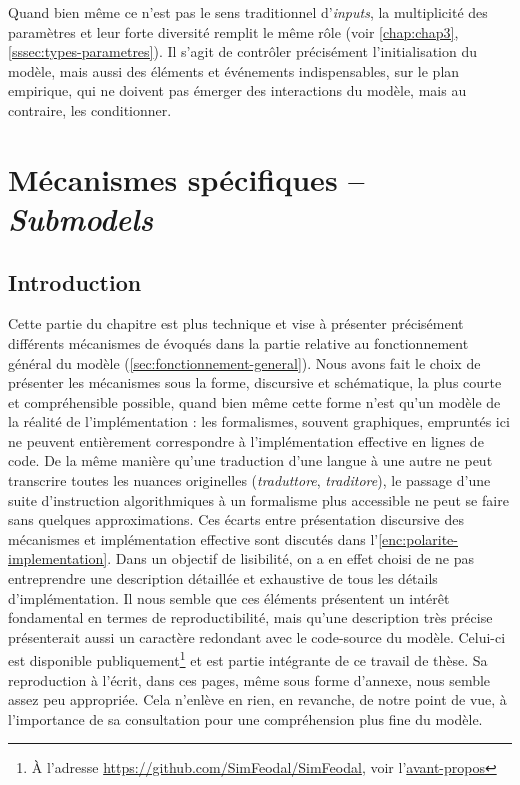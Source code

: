 Quand bien même ce n'est pas le sens traditionnel d'\textit{inputs}, la multiplicité des paramètres et leur forte diversité remplit le même rôle (voir \cref{chap:chap3}, \cref{sssec:types-parametres}).
Il s'agit de contrôler précisément l'initialisation du modèle, mais aussi des éléments et événements indispensables, sur le plan empirique, qui ne doivent pas émerger des interactions du modèle, mais au contraire, les conditionner.


\let\orisectionmark\sectionmark
\renewcommand\sectionmark[1]{}%
\section[Mécanismes spécifiques -- \textit{Submodels}]{Mécanismes spécifiques -- \large{\textit{Submodels}} \label{sec:meca-specifiques}}
\orisectionmark{Mécanismes spécifiques}
\let\sectionmark\orisectionmark



\subsection{Introduction}

Cette partie du chapitre est plus technique et vise à présenter précisément différents mécanismes de \simfeodal{} évoqués dans la partie relative au fonctionnement général du modèle (\cref{sec:fonctionnement-general}).
Nous avons fait le choix de présenter les mécanismes sous la forme, discursive et schématique, la plus courte et compréhensible possible, quand bien même cette forme n'est qu'un \og modèle\fg{} de la réalité de l'implémentation : les formalismes, souvent graphiques, empruntés ici ne peuvent entièrement correspondre à l'implémentation effective en lignes de code.
De la même manière qu'une traduction d'une langue à une autre ne peut transcrire toutes les nuances originelles (\textit{traduttore}, \textit{traditore}), le passage d'une suite d'instruction algorithmiques à un formalisme plus accessible ne peut se faire sans quelques approximations.
Ces écarts entre présentation discursive des mécanismes et implémentation effective sont discutés dans l'\cref{enc:polarite-implementation}.
Dans un objectif de lisibilité, on a en effet choisi de ne pas entreprendre une description détaillée et exhaustive de tous les détails d'implémentation.
Il nous semble que ces éléments présentent un intérêt fondamental en termes de reproductibilité, mais qu'une description très précise présenterait aussi un caractère redondant avec le code-source du modèle.
Celui-ci est disponible publiquement\footnote{
	À l'adresse \href{https://github.com/SimFeodal/SimFeodal}{https://github.com/SimFeodal/SimFeodal}, voir l'\hyperlink{avant-propos}{avant-propos}
} et est partie intégrante de ce travail de thèse.
Sa reproduction à l'écrit, dans ces pages, même sous forme d'annexe, nous semble assez peu appropriée.
Cela n'enlève en rien, en revanche, de notre point de vue, à l'importance de sa consultation pour une compréhension plus fine du modèle.

